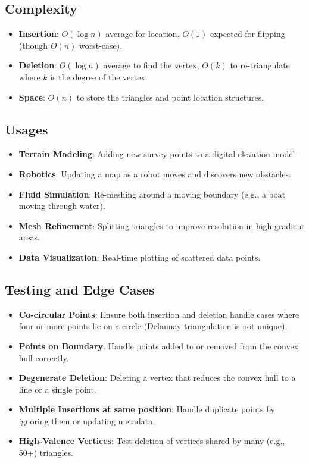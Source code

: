\subsection{Complexity}

\begin{itemize}
\item \textbf{Insertion}: $O(\log n)$ average for location, $O(1)$ expected for flipping (though $O(n)$ worst-case).
\item \textbf{Deletion}: $O(\log n)$ average to find the vertex, $O(k)$ to re-triangulate where $k$ is the degree of the vertex.
\item \textbf{Space}: $O(n)$ to store the triangles and point location structures.
\end{itemize}

\subsection{Usages}

\begin{itemize}
\item \textbf{Terrain Modeling}: Adding new survey points to a digital elevation model.
\item \textbf{Robotics}: Updating a map as a robot moves and discovers new obstacles.
\item \textbf{Fluid Simulation}: Re-meshing around a moving boundary (e.g., a boat moving through water).
\item \textbf{Mesh Refinement}: Splitting triangles to improve resolution in high-gradient areas.
\item \textbf{Data Visualization}: Real-time plotting of scattered data points.
\end{itemize}

\subsection{Testing and Edge Cases}

\begin{itemize}
\item \textbf{Co-circular Points}: Ensure both insertion and deletion handle cases where four or more points lie on a circle (Delaunay triangulation is not unique).
\item \textbf{Points on Boundary}: Handle points added to or removed from the convex hull correctly.
\item \textbf{Degenerate Deletion}: Deleting a vertex that reduces the convex hull to a line or a single point.
\item \textbf{Multiple Insertions at same position}: Handle duplicate points by ignoring them or updating metadata.
\item \textbf{High-Valence Vertices}: Test deletion of vertices shared by many (e.g., 50+) triangles.
\end{itemize}

